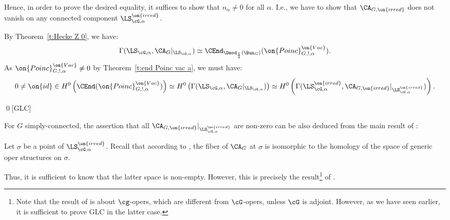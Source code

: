 \documentclass[9pt]{amsart}
\theoremstyle{remark}
\newtheorem{rem}[subsubsection]{Remark}
\theoremstyle{definition}
\theoremstyle{remark}
\newcommand{\thmref}[1]{Theorem~\ref{#1}}
\numberwithin{equation}{section}
\begin{document}
Hence, in order to prove the desired equality, it suffices to show that $n_\alpha\neq 0$ for all $\alpha$. I.e., we have to show
that $\CA_{G,\on{irred}}$ does not vanish on any connected component $\LS^{\on{irred}}_{\cG,\alpha}$.



%

By \thmref{t:Hecke Z 0}, we have:
$$\Gamma(\LS_{\cG,\alpha},\CA_G|_{\LS_{\cG,\alpha}})\simeq 
\CEnd_{\Dmod_{\frac{1}{2}}(\Bun_G)}(\on{Poinc}^{\on{Vac}}_{G,!,\alpha}).$$
As $\on{Poinc}^{\on{Vac}}_{G,!,\alpha} \neq 0$
by \thmref{t:end Poinc vac a}, we must have:
\[
0 \neq \on{id} \in 
H^0\left(\CEnd(\on{Poinc}^{\on{Vac}}_{G,!,\alpha}) \right)\simeq
H^0\left(\Gamma(\LS_{\cG,\alpha},\CA_G|_{\LS_{\cG,\alpha}}) \right)\simeq
H^0\left(\Gamma(\LS^{\on{irred}}_{\cG,\alpha},\CA_{G,\on{irred}}|_{\LS^{\on{irred}}_{\cG,\alpha}})\right).
\]

\noindent 

\qed[GLC]


\sssec{}

For $G$ simply-connected, the assertion that all $\CA_{G,\on{irred}}|_{\LS^{\on{irred}}_{\cG,\alpha}}$ are non-zero can be also deduced
from the main result of \cite{Ari}:

\medskip

Let $\sigma$ be a point of $\LS^{\on{irred}}_{\cG,\alpha}$. Recall that according to \cite[Theorem 3.1.5]{GLC4}, the fiber
of $\CA_G$ at $\sigma$ is isomorphic to the homology of the space of generic oper structures on $\sigma$.

\medskip

Thus, it is sufficient to know that the latter space is non-empty. However, this is precisely the 
result\footnote{Note that the result of \cite{Ari} is about $\cg$-opers, which are different from $\cG$-opers, unless $\cG$ is adjoint.
However, as we have seen earlier, it is sufficient to prove GLC in the latter case.}
of \cite{Ari}.
\end{document}
